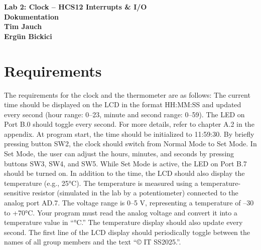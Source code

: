 \documentclass[a4paper,12pt]{article}
\begin{document}
\thispagestyle{empty}
\vspace*{3cm}
\begin{center}
    \textbf{\LARGE{Lab 2: Clock – HCS12 Interrupts \& I/O}}\\[1cm]
    \textbf{\LARGE{Dokumentation}}\\[3cm]
    \textbf{Tim Jauch}\\[0.5cm]
    \textbf{Ergün Bickici}
\end{center}

\newpage

\tableofcontents
\newpage

\listoffigures
\newpage

\listoftables
\newpage

\section{Requirements}
The requirements for the clock and the thermometer are as follows:
The current time should be displayed on the LCD in the format HH:MM:SS and updated every second (hour range: 0–23, minute and second range: 0–59). The LED on Port B.0 should toggle every second. For more details, refer to chapter A.2 in the appendix.
At program start, the time should be initialized to 11:59:30. By briefly pressing button SW2, the clock should switch from Normal Mode to Set Mode. In Set Mode, the user can adjust the hours, minutes, and seconds by pressing buttons SW3, SW4, and SW5. While Set Mode is active, the LED on Port B.7 should be turned on.
In addition to the time, the LCD should also display the temperature (e.g., 25°C). The temperature is measured using a temperature-sensitive resistor (simulated in the lab by a potentiometer) connected to the analog port AD.7. The voltage range is 0–5 V, representing a temperature of –30 to +70°C. Your program must read the analog voltage and convert it into a temperature value in “°C.” The temperature display should also update every second.
The first line of the LCD display should periodically toggle between the names of all group members and the text “© IT SS2025.”.
\end{document}
